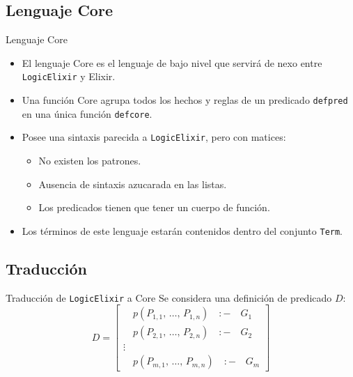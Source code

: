 \documentclass[14pt,aspectratio=169]{beamer}
\begin{document}
\subsection{Lenguaje Core}
\begin{frame}{Lenguaje Core}
  \begin{itemize}
    \item El lenguaje Core es el lenguaje de bajo nivel que servirá de nexo
    entre \texttt{LogicElixir} y Elixir.
    \item Una función Core agrupa todos los hechos y reglas de un predicado
    \texttt{defpred} en una única función \texttt{defcore}.
    \item Posee una sintaxis parecida a \texttt{LogicElixir}, pero con matices:
    \begin{itemize}
      \item No existen los patrones.
      \item Ausencia de sintaxis azucarada en las listas.
      \item Los predicados tienen que tener un cuerpo de función.
    \end{itemize}
    \item Los términos de este lenguaje estarán contenidos dentro del conjunto
    \texttt{Term}.
  \end{itemize}
\end{frame}

\subsection{Traducción}
\begin{frame}{Traducción de \texttt{LogicElixir} a Core}
  Se considera una definición de predicado $D$:
  \begin{equation*}
    D =
    \begin{bmatrix}
      \quad p(P_{1,1},\, \ldots,\, P_{1,n}) \quad :- \quad G_1\\
      \quad p(P_{2,1},\, \ldots,\, P_{2,n}) \quad :- \quad G_2\\
      \vdots \\
      \quad p(P_{m,1},\, \ldots,\, P_{m,n}) \quad :- \quad G_m
    \end{bmatrix}
  \end{equation*}
\end{frame}
\end{document}
